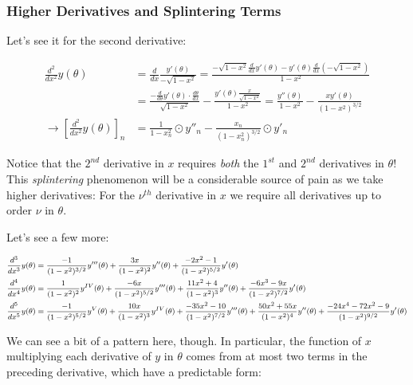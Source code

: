 \documentclass[10pt]{article}
\begin{document}
\subsubsection{Higher Derivatives and Splintering Terms}

Let's see it for the second derivative:

\begin{align*}
\frac{d^2}{dx^2} y(\theta) &= \frac{d}{dx} \frac{y'(\theta)}{-\sqrt{1-x^2}} = \frac{-\sqrt{1-x^2} \frac{d}{dx} y'(\theta) - y'(\theta) \frac{d}{dx} (-\sqrt{1-x^2})}{1 - x^2} \\
&= \frac{-\frac{d}{d\theta}y'(\theta)\cdot \frac{d\theta}{dx}}{\sqrt{1-x^2}} - \frac{y'(\theta)\frac{x}{\sqrt{1-x^2}}}{1 - x^2} = \frac{y''(\theta)}{1-x^2} - \frac{x y'(\theta)}{(1 - x^2)^{3/2}} \\
\longrightarrow [\frac{d^2}{dx^2} y(\theta)]_n &= \frac{1}{1-x_n^2} \odot y''_n - \frac{x_n}{(1 - x_n^2)^{3/2}} \odot y'_n
\end{align*}

Notice that the $2^{nd}$ derivative in $x$ requires \textit{both} the $1^{st}$ and $2^{nd}$ derivatives in $\theta$! This \textit{splintering} phenomenon will be a considerable source of pain as we take higher derivatives: For the $\nu^{th}$ derivative in $x$ we require all derivatives up to order $\nu$ in $\theta$.

Let's see a few more:

\begin{equation}\label{derivatives}
\footnotesize
\begin{aligned}
\frac{d^3}{dx^3} y(\theta) &= \frac{-1}{(1-x^2)^{3/2}} y'''(\theta) + \frac{3x}{(1-x^2)^2} y''(\theta) + \frac{-2x^2 - 1}{(1-x^2)^{5/2}} y'(\theta)\\
\frac{d^4}{dx^4} y(\theta) &= \frac{1}{(1-x^2)^2} y^{IV}(\theta) + \frac{-6x}{(1-x^2)^{5/2}} y'''(\theta) + \frac{11x^2 + 4}{(1-x^2)^3} y''(\theta) + \frac{-6x^3 - 9x}{(1-x^2)^{7/2}} y'(\theta)\\
\frac{d^5}{dx^5} y(\theta) &= \frac{-1}{(1-x^2)^{5/2}} y^V(\theta) + \frac{10x}{(1-x^2)^3} y^{IV}(\theta) + \frac{-35x^2-10}{(1-x^2)^{7/2}} y'''(\theta) + \frac{50x^2 + 55x}{(1-x^2)^4} y''(\theta) + \frac{-24x^4 -72x^2 - 9}{(1-x^2)^{9/2}} y'(\theta)\\
\end{aligned}
\normalsize
\end{equation}

We can see a bit of a pattern here, though. In particular, the function of $x$ multiplying each derivative of $y$ in $\theta$ comes from at most two terms in the preceding derivative, which have a predictable form:\vspace{-2mm}
\end{document}
